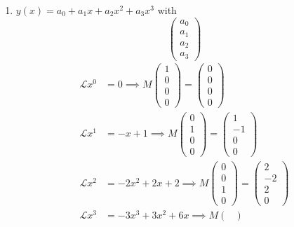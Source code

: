 \documentclass[10pt, a4paper]{article}
\begin{document}
\begin{problem}[Resit $2022$]
\begin{solution}
\begin{enumerate}[label = (\alph*)]
            \item $y(x) = a_0 + a_1x + a_2x ^ 2 + a_3x ^ 3$
            with
            \[
            \begin{pmatrix}
                a_0 \\ a_1 \\ a_2 \\ a_3
            \end{pmatrix}
            \]
            \begin{align*}
               \mathcal{L}x ^ 0 &= 0 \implies M\begin{pmatrix}
                    1 \\ 0 \\ 0 \\ 0
                \end{pmatrix} = \begin{pmatrix}
                    0 \\ 0 \\ 0 \\ 0
                \end{pmatrix} \\
               \mathcal{L}x ^ 1 &= -x + 1 \implies M\begin{pmatrix}
                    0 \\ 1 \\ 0 \\ 0
                \end{pmatrix} = \begin{pmatrix}
                    1 \\ -1 \\ 0 \\ 0
                \end{pmatrix} \\
               \mathcal{L}x ^ 2 &= -2x ^ 2 + 2x + 2 \implies M\begin{pmatrix}
                    0 \\ 0 \\ 1 \\ 0
                \end{pmatrix} = \begin{pmatrix}
                    2 \\ -2 \\ 2 \\ 0
                \end{pmatrix} \\
               \mathcal{L}x ^ 3 &= -3x ^ 3 + 3x ^ 2 + 6x \implies M\begin{pmatrix}

\end{pmatrix}
\end{align*}
\end{enumerate}
\end{solution}
\end{problem}
\end{document}
